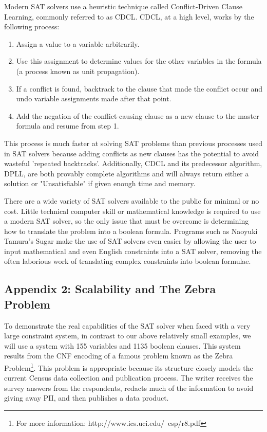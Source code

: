 \documentclass[jou,apacite]{apa6}
\begin{document}
Modern SAT solvers use a heuristic technique called Conflict-Driven Clause Learning, commonly referred to as CDCL. CDCL, at a high level, works by the following process:

\begin{enumerate}

\item Assign a value to a variable arbitrarily.
\item Use this assignment to determine values for the other variables in the formula (a process known as unit propagation).
\item If a conflict is found, backtrack to the clause that made the conflict occur and undo variable assignments made after that point.
\item Add the negation of the conflict-causing clause as a new clause to the master formula and resume from step 1.

\end{enumerate}

This process is much faster at solving SAT problems than previous processes used in SAT solvers because adding conflicts as new clauses has the potential to avoid wasteful 'repeated backtracks'. Additionally, CDCL and its predecessor algorithm, DPLL, are both provably complete algorithms and will always return either a solution or "Unsatisfiable" if given enough time and memory.

There are a wide variety of SAT solvers available to the public for minimal or no cost. Little technical computer skill or mathematical knowledge is required to use a modern SAT solver, so the only issue that must be overcome is determining how to translate the problem into a boolean formula. Programs such as Naoyuki Tamura's Sugar make the use of SAT solvers even easier by allowing the user to input mathematical and even English constraints into a SAT solver, removing the often laborious work of translating complex constraints into boolean formulae.

\subsection{Appendix 2: Scalability and The Zebra Problem}

To demonstrate the real capabilities of the SAT solver when faced with a very large constraint system, in contrast to our above relatively small examples, we will use a system with 155 variables and 1135 boolean clauses. This system results from the CNF encoding of a famous problem known as the Zebra Problem\cite{zebra}\footnote{For more information: http://www.ics.uci.edu/~csp/r8.pdf}.
This problem is appropriate because its structure closely models the current Census data collection and publication process. The writer receives the survey answers from the respondents, redacts much of the information to avoid giving away PII, and then publishes a data product.
\end{document}
